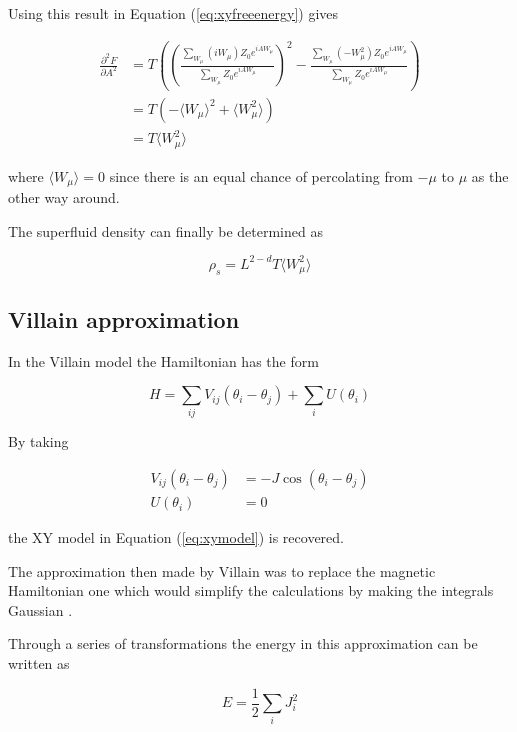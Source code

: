 Using this result in Equation (\ref{eq:xyfreeenergy}) gives

\begin{align}
    \frac{\partial^2 F}{\partial A^2} &= T \left ( \left ( \frac{\sum_{W_\mu} (i W_\mu) Z_0 e^{iAW_\mu}}{\sum_{W_\mu} Z_0 e^{iAW_\mu}} \right )^2 - \frac{\sum_{W_\mu} (- W_\mu^2) Z_0 e^{iAW_\mu}}{\sum_{W_\mu} Z_0 e^{iAW_\mu}} \right ) \\
%
    &= T \left ( -\langle W_\mu \rangle^2 + \langle W_\mu^2 \rangle \right ) \\
%
    &= T \langle W_\mu^2 \rangle
\end{align}

where $\langle W_\mu \rangle = 0$ since there is an equal chance of percolating from $-\mu$ to $\mu$ as the other way around.

The superfluid density can finally be determined as

\begin{equation}
    \rho_s = L^{2 - d} T \langle W_\mu^2 \rangle 
\end{equation}

\subsection{Villain approximation}
\label{subsec:villainApprox}


In the Villain model the Hamiltonian has the form \cite{Villain:VillainOriginalPaper}

\begin{equation}    
    H = \sum_{ij} V_{ij}( \theta_i - \theta_j) + \sum_i U(\theta_i)
\end{equation}

By taking

\begin{align}
    V_{ij}( \theta_i - \theta_j) &= -J \cos ( \theta_i - \theta_j) \\
    U( \theta_i ) &= 0
\end{align}

the XY model in Equation (\ref{eq:xymodel}) is recovered.

The approximation then made by Villain was to replace the magnetic Hamiltonian one which would simplify the calculations by making the integrals Gaussian \cite{Villain:VillainOriginalPaper}.

Through a series of transformations the energy in this approximation can be written as \cite{Jos:VillainExtended}

\begin{equation}
    E = \frac{1}{2} \sum_i J_i^2
\end{equation}

